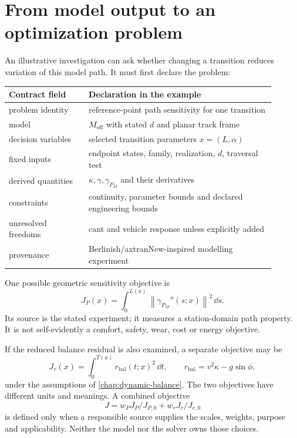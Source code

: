 \section{From model output to an optimization problem}

An illustrative investigation can ask whether changing a transition reduces
variation of this model path. It must first declare the problem:

\begin{center}
\small
\begin{tabular}{p{0.27\linewidth}p{0.63\linewidth}}
\toprule
Contract field & Declaration in the example\\
\midrule
problem identity & reference-point path sensitivity for one transition\\
model & \(M_{\mathrm{off}}\) with stated \(d\) and planar track frame\\
decision variables & selected transition parameters \(x=(L,\alpha)\)\\
fixed inputs & endpoint states, family, realization, \(d\), traversal test\\
derived quantities & \(\kappa,\gamma,\gamma_{P_M}\) and their derivatives\\
constraints & continuity, parameter bounds and declared engineering bounds\\
unresolved freedoms & cant and vehicle response unless explicitly added\\
provenance & Berlinish/axtranNew-inspired modelling experiment\\
\bottomrule
\end{tabular}
\end{center}

One possible geometric sensitivity objective is
\[
J_P(x)=\int_0^{L(x)}
\left\|\gamma_{P_M}''(s;x)\right\|^2\,\dd s .
\]
Its source is the stated experiment; it measures a station-domain path
property. It is not self-evidently a comfort, safety, wear, cost or energy
objective.

If the reduced balance residual is also examined, a separate objective may be
\[
J_r(x)=\int_0^{T(x)}
r_{\mathrm{bal}}(t;x)^2\,\dd t,
\qquad
r_{\mathrm{bal}}=v^2\kappa-g\sin\phi,
\]
under the assumptions of \cref{chap:dynamic-balance}. The two objectives have
different units and meanings. A combined objective
\[
J=w_PJ_P/J_{P,0}+w_rJ_r/J_{r,0}
\]
is defined only when a responsible source supplies the scales, weights,
purpose and applicability. Neither the model nor the solver owns those
choices.


